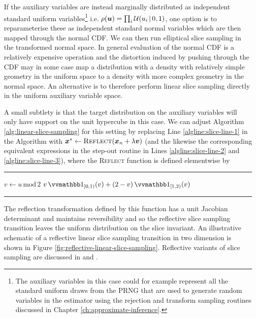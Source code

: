 If the auxiliary variables are instead marginally distributed as independent standard uniform variables\footnote{The auxiliary variables in this case could for example represent all the standard uniform draws from the \ac{PRNG} that are used to generate random variables in the estimator using the rejection and transform sampling routines discussed in Chapter \ref{ch:approximate-inference}.} i.e. $\rho(\boldsymbol{u}) = \prod_{i}\mathcal{U}(u_i \operatorname{|} 0, 1)$, one option is to reparameterise these as independent standard normal variables which are then mapped through the normal \ac{CDF}. We can then run elliptical slice sampling in the transformed normal space. In general evaluation of the normal \ac{CDF} is a relatively expensive operation and the distortion induced by pushing through the \ac{CDF} may in some case map a distribution with a density with relatively simple geometry in the uniform space to a density with more complex geometry in the normal space. An alternative is to therefore perform linear slice sampling directly in the uniform auxiliary variable space. 

A small subtlety is that the target distribution on the auxiliary variables will only have support on the unit hypercube in this case. We can adjust Algorithm \ref{alg:linear-slice-sampling} for this setting by replacing Line \ref{algline:slice-line-1} in the Algorithm with $\boldsymbol{x}^* \gets \textsc{Reflect}(\boldsymbol{x}_n + \lambda \boldsymbol{v})$ (and the likewise the corresponding equivalent expressions in the step-out routine in Lines \ref{algline:slice-line-2} and \ref{algline:slice-line-3}), where the \textsc{Reflect} function is defined elementwise by 
{
\vspace{5mm}
\hrule
\small
\vspace{1mm}
\begin{algorithmic}
    \State $v \gets u \,\textrm{mod}\, 2$
    \State \Return $v \ind{[0,1)}(v) + (2-v) \ind{[1,2)}(v)$
  \EndFunction
\end{algorithmic}
\vspace{2mm}
\hrule
\vspace{3mm}
}
The reflection transformation defined by this function has a unit Jacobian determinant and maintains reversibility and so the reflective slice sampling transition leaves the uniform distribution on the slice invariant. An illustrative schematic of a reflective linear slice sampling transition in two dimension is shown in Figure \ref{fig:reflective-linear-slice-sampling}. Reflective variants of slice sampling are discussed in \citep{neal2003slice} and \citep{downs2000nonnegative}.


